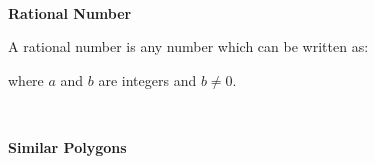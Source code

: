 \begin{description}
\begin{description}
          \\\end{description}
	    \item[] \noindent\raggedright {\bf  Rational Number }\\\begin{description}\item{\hspace{.3cm}}\hspace{.3cm}
      \label{m38348*id62709}A rational number is any number which can be written as:\par 
      \label{m38348*uid6}\nopagebreak\noindent{}
      \label{m38348*id62732}where $a$ and \begin{math}b\end{math} are integers and \begin{math}b\ne 0\end{math}. \par 
      \\\end{description}
	    \vspace{.3cm}
	    \item[{\large \bfseries S}]\noindent\raggedright
	    {\bf  Similar Polygons }\\\begin{description}\item{\hspace{.3cm}}\hspace{.3cm}

\end{description}
\end{description}
